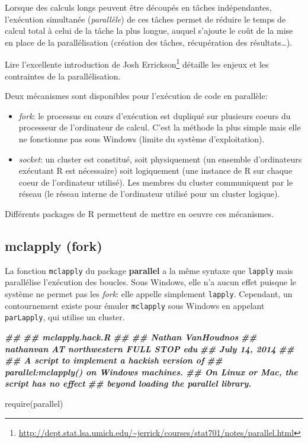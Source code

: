 \documentclass[
  11pt,
  french,
  a4paper,
  extrafontsizes,onecolumn,openright
  ]{memoir}
\newenvironment{Shaded}{\begin{snugshade}}{\end{snugshade}}
\newcommand{\DocumentationTok}[1]{\textcolor[rgb]{0.56,0.35,0.01}{\textbf{\textit{#1}}}}
\newcommand{\FunctionTok}[1]{\textcolor[rgb]{0.00,0.00,0.00}{#1}}
\newcommand{\NormalTok}[1]{#1}
\providecommand{\tightlist}{%
  \setlength{\itemsep}{0pt}\setlength{\parskip}{0pt}}
\begin{document}
Lorsque des calculs longs peuvent être découpés en tâches indépendantes, l'exécution simultanée (\emph{parallèle}) de ces tâches permet de réduire le temps de calcul total à celui de la tâche la plus longue, auquel s'ajoute le coût de la mise en place de la parallélisation (création des tâches, récupération des résultats\ldots).

Lire l'excellente introduction de Josh Errickson\footnote{\url{http://dept.stat.lsa.umich.edu/~jerrick/courses/stat701/notes/parallel.html}} détaille les enjeux et les contraintes de la parallélisation.

Deux mécanismes sont disponibles pour l'exécution de code en parallèle:

\begin{itemize}
\tightlist
\item
  \emph{fork}: le processus en cours d'exécution est dupliqué sur plusieurs coeurs du processeur de l'ordinateur de calcul.
  C'est la méthode la plus simple mais elle ne fonctionne pas sous Windows (limite du système d'exploitation).
\item
  \emph{socket}: un cluster est constitué, soit physiquement (un ensemble d'ordinateurs exécutant R est nécessaire) soit logiquement (une instance de R sur chaque coeur de l'ordinateur utilisé).
  Les membres du cluster communiquent par le réseau (le réseau interne de l'ordinateur utilisé pour un cluster logique).
\end{itemize}

Différents packages de R permettent de mettre en oeuvre ces mécanismes.

\hypertarget{mclapply-fork}{%
\subsection{mclapply (fork)}\label{mclapply-fork}}

La fonction \texttt{mclapply} du package \textbf{parallel} a la même syntaxe que \texttt{lapply} mais parallélise l'exécution des boucles.
Sous Windows, elle n'a aucun effet puisque le système ne permet pas les \emph{fork}: elle appelle simplement \texttt{lapply}.
Cependant, un contournement existe pour émuler \texttt{mclapply} sous Windows en appelant \texttt{parLapply}, qui utilise un cluster.

\scriptsize

\begin{Shaded}
\begin{Highlighting}[]
\DocumentationTok{\#\#}
\DocumentationTok{\#\# mclapply.hack.R}
\DocumentationTok{\#\#}
\DocumentationTok{\#\# Nathan VanHoudnos}
\DocumentationTok{\#\# nathanvan AT northwestern FULL STOP edu}
\DocumentationTok{\#\# July 14, 2014}
\DocumentationTok{\#\#}
\DocumentationTok{\#\# A script to implement a hackish version of }
\DocumentationTok{\#\# parallel:mclapply() on Windows machines.}
\DocumentationTok{\#\# On Linux or Mac, the script has no effect}
\DocumentationTok{\#\# beyond loading the parallel library. }

\FunctionTok{require}\NormalTok{(parallel)    }
\end{Highlighting}
\end{Shaded}
\end{document}
